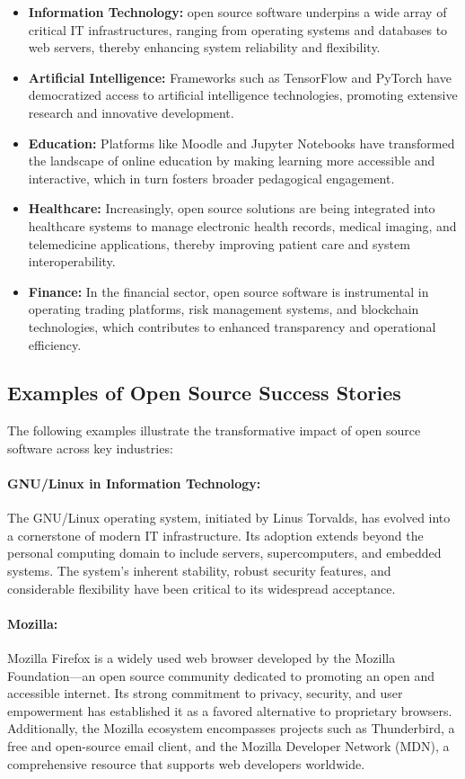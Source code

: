 \begin{itemize}
    \item \textbf{Information Technology:} open source software underpins a wide array of critical IT infrastructures, ranging from operating systems and databases to web servers, thereby enhancing system reliability and flexibility.
    \item \textbf{Artificial Intelligence:} Frameworks such as TensorFlow and PyTorch have democratized access to artificial intelligence technologies, promoting extensive research and innovative development.
    \item \textbf{Education:} Platforms like Moodle and Jupyter Notebooks have transformed the landscape of online education by making learning more accessible and interactive, which in turn fosters broader pedagogical engagement.
    \item \textbf{Healthcare:} Increasingly, open source solutions are being integrated into healthcare systems to manage electronic health records, medical imaging, and telemedicine applications, thereby improving patient care and system interoperability.
    \item \textbf{Finance:} In the financial sector, open source software is instrumental in operating trading platforms, risk management systems, and blockchain technologies, which contributes to enhanced transparency and operational efficiency.
\end{itemize}

\subsection{Examples of Open Source Success Stories}

The following examples illustrate the transformative impact of open source software across key industries:

\paragraph{GNU/Linux in Information Technology:}  
The GNU/Linux operating system, initiated by Linus Torvalds, has evolved into a cornerstone of modern IT infrastructure. Its adoption extends beyond the personal computing domain to include servers, supercomputers, and embedded systems. The system’s inherent stability, robust security features, and considerable flexibility have been critical to its widespread acceptance.

\paragraph{Mozilla:}  
Mozilla Firefox is a widely used web browser developed by the Mozilla Foundation—an open source community dedicated to promoting an open and accessible internet. Its strong commitment to privacy, security, and user empowerment has established it as a favored alternative to proprietary browsers. Additionally, the Mozilla ecosystem encompasses projects such as Thunderbird, a free and open-source email client, and the Mozilla Developer Network (MDN), a comprehensive resource that supports web developers worldwide.

